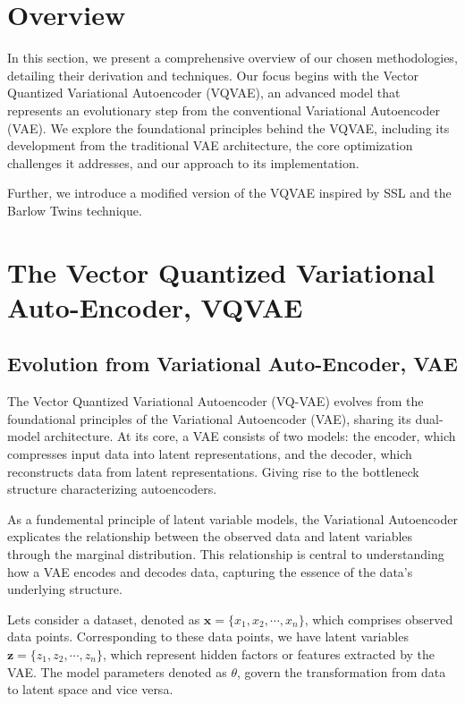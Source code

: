 
\section{Overview}
In this section, we present a comprehensive overview of our chosen methodologies, detailing their derivation and techniques. Our focus begins with the Vector Quantized Variational Autoencoder (VQVAE), an advanced model that represents an evolutionary step from the conventional Variational Autoencoder (VAE). We explore the foundational principles behind the VQVAE, including its development from the traditional VAE architecture, the core optimization challenges it addresses, and our approach to its implementation.

Further, we introduce a modified version of the VQVAE inspired by SSL and the Barlow Twins technique.


\section{The Vector Quantized Variational Auto-Encoder, VQVAE}

\subsection{Evolution from Variational Auto-Encoder, VAE}
The Vector Quantized Variational Autoencoder (VQ-VAE) evolves from the foundational principles of the Variational Autoencoder (VAE), sharing its dual-model architecture. 
At its core, a VAE consists of two models: the encoder, which compresses input data into latent representations, and the decoder, which reconstructs data from latent representations.
Giving rise to the bottleneck structure characterizing autoencoders.

As a fundemental principle of latent variable models, the Variational Autoencoder explicates the relationship between the observed data and latent variables through the marginal distribution. This relationship is central to understanding how a VAE encodes and decodes data, capturing the essence of the data's underlying structure.

Lets consider a dataset, denoted as $\mathbf{x}=\{x_1, x_2, \cdots, x_n \}$, which comprises observed data points. Corresponding to these data points, we have latent variables $\mathbf{z}=\{z_1, z_2, \cdots, z_n \}$, which represent hidden factors or features extracted by the VAE.
The model parameters denoted as $\theta$, govern the transformation from data to latent space and vice versa.

